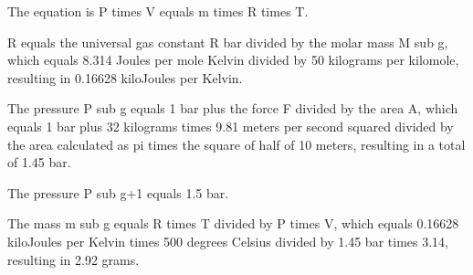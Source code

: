 The equation is P times V equals m times R times T.

R equals the universal gas constant R bar divided by the molar mass M sub g, which equals 8.314 Joules per mole Kelvin divided by 50 kilograms per kilomole, resulting in 0.16628 kiloJoules per Kelvin.

The pressure P sub g equals 1 bar plus the force F divided by the area A, which equals 1 bar plus 32 kilograms times 9.81 meters per second squared divided by the area calculated as pi times the square of half of 10 meters, resulting in a total of 1.45 bar.

The pressure P sub g+1 equals 1.5 bar.

The mass m sub g equals R times T divided by P times V, which equals 0.16628 kiloJoules per Kelvin times 500 degrees Celsius divided by 1.45 bar times 3.14, resulting in 2.92 grams.